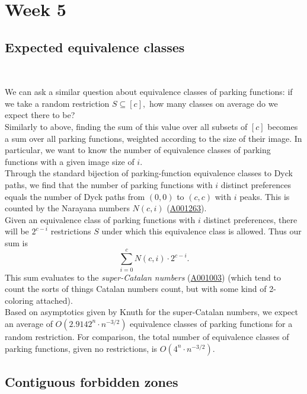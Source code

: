 \section{Week 5}

\subsection*{Expected equivalence classes}~

We can ask a similar question about equivalence classes of parking functions: if we take a random restriction $S\subseteq [c],$ how many classes on average do we expect there to be?\\

Similarly to above, finding the sum of this value over all subsets of $[c]$ becomes a sum over all parking functions, weighted according to the size of their image. In particular, we want to know the number of equivalence classes of parking functions with a given image size of $i.$\\

Through the standard bijection of parking-function equivalence classes to Dyck paths, we find that the number of parking functions with $i$ distinct preferences equals the number of Dyck paths from $(0,0)$ to $(c,c)$ with $i$ peaks. This is counted by the Narayana numbers $N(c,i)$ (\href{https://oeis.org/A001263}{A001263}).\\

Given an equivalence class of parking functions with $i$ distinct preferences, there will be $2^{c-i}$ restrictions $S$ under which this equivalence class is allowed. Thus our sum is $$\sum_{i=0}^c N(c,i)\cdot 2^{c-i}.$$ This sum evaluates to the \textit{super-Catalan numbers} (\href{https://oeis.org/A001003}{A001003}) (which tend to count the sorts of things Catalan numbers count, but with some kind of 2-coloring attached).\\

Based on asymptotics given by Knuth for the super-Catalan numbers, we expect an average of $O(2.9142^n\cdot n^{-3/2})$ equivalence classes of parking functions for a random restriction. For comparison, the total number of equivalence classes of parking functions, given no restrictions, is $O(4^n\cdot n^{-3/2}).$

\subsection*{Contiguous forbidden zones}~

